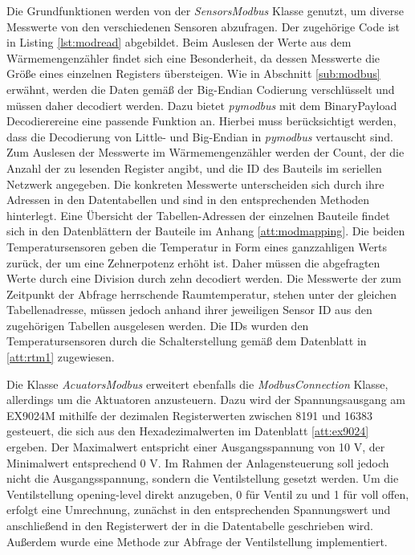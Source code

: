 

Die Grundfunktionen werden von der \textit{SensorsModbus} Klasse genutzt, um diverse Messwerte von den verschiedenen Sensoren abzufragen. Der zugehörige Code ist in Listing \ref{lst:modread} abgebildet.
Beim Auslesen der Werte aus dem Wärmemengenzähler findet sich eine Besonderheit, da dessen Messwerte die Größe eines einzelnen Registers übersteigen. Wie in Abschnitt \ref{sub:modbus} erwähnt, werden die Daten gemäß der Big-Endian Codierung verschlüsselt und müssen daher decodiert werden. Dazu bietet \textit{pymodbus} mit dem BinaryPayload Decodierereine eine passende Funktion an. Hierbei muss berücksichtigt werden, dass die Decodierung von Little- und Big-Endian in \textit{pymodbus} vertauscht sind. Zum Auslesen der Messwerte im Wärmemengenzähler werden der Count, der die Anzahl der zu lesenden Register angibt, und die ID des Bauteils im seriellen Netzwerk angegeben. Die konkreten Messwerte unterscheiden sich durch ihre Adressen in den Datentabellen und sind in den entsprechenden Methoden hinterlegt. 
Eine Übersicht der Tabellen-Adressen der einzelnen Bauteile findet sich in den Datenblättern der Bauteile im Anhang \ref{att:modmapping}.
Die beiden Temperatursensoren geben die Temperatur in Form eines ganzzahligen Werts zurück, der um eine Zehnerpotenz erhöht ist. Daher müssen die abgefragten Werte durch eine Division durch zehn decodiert werden. Die Messwerte der zum Zeitpunkt der Abfrage herrschende Raumtemperatur, stehen unter der gleichen Tabellenadresse, müssen jedoch anhand ihrer jeweiligen Sensor ID aus den zugehörigen Tabellen ausgelesen werden. Die IDs wurden den Temperatursensoren durch die Schalterstellung gemäß dem Datenblatt in \ref{att:rtm1} zugewiesen.



Die Klasse \textit{AcuatorsModbus} erweitert ebenfalls die \textit{ModbusConnection} Klasse, allerdings um die Aktuatoren anzusteuern. Dazu wird der Spannungsausgang am \textsc{EX9024M} mithilfe der dezimalen Registerwerten zwischen 8191 und 16383 gesteuert, die sich aus den Hexadezimalwerten im Datenblatt \ref{att:ex9024} ergeben. Der Maximalwert entspricht einer Ausgangsspannung von 10 V, der Minimalwert entsprechend 0 V. Im Rahmen der Anlagensteuerung soll jedoch nicht die Ausgangsspannung, sondern die Ventilstellung gesetzt werden. Um die Ventilstellung opening-level direkt anzugeben, 0 für Ventil zu und 1 für voll offen, erfolgt eine Umrechnung, zunächst in den entsprechenden Spannungswert und anschließend in den Registerwert der in die Datentabelle geschrieben wird. Außerdem wurde eine Methode zur Abfrage der Ventilstellung implementiert.


